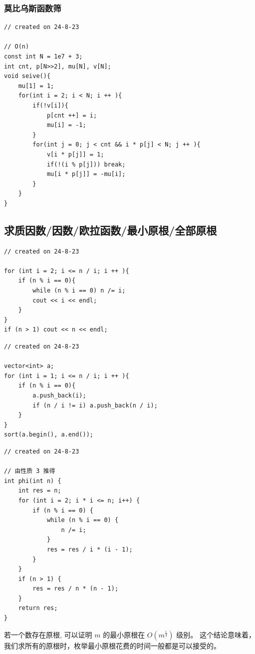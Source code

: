 \documentclass[a4paper,12pt]{article}
\begin{document}
\subsubsection{莫比乌斯函数筛}

\begin{lstlisting}
// created on 24-8-23

// O(n)
const int N = 1e7 + 3;
int cnt, p[N>>2], mu[N], v[N];
void seive(){
    mu[1] = 1;
    for(int i = 2; i < N; i ++ ){
        if(!v[i]){
            p[cnt ++] = i;
            mu[i] = -1;
        }
        for(int j = 0; j < cnt && i * p[j] < N; j ++ ){
            v[i * p[j]] = 1;
            if(!(i % p[j])) break;
            mu[i * p[j]] = -mu[i];
        }
    }
}
\end{lstlisting}

\subsection{求质因数/因数/欧拉函数/最小原根/全部原根}

\begin{lstlisting}
// created on 24-8-23

for (int i = 2; i <= n / i; i ++ ){
    if (n % i == 0){
        while (n % i == 0) n /= i;
        cout << i << endl;
    }
}
if (n > 1) cout << n << endl;
\end{lstlisting}

\begin{lstlisting}
// created on 24-8-23

vector<int> a;
for (int i = 1; i <= n / i; i ++ ){
    if (n % i == 0){
        a.push_back(i);
        if (n / i != i) a.push_back(n / i);
    }
}
sort(a.begin(), a.end());
\end{lstlisting}

\begin{lstlisting}
// created on 24-8-23

// 由性质 3 推得
int phi(int n) {
    int res = n;
    for (int i = 2; i * i <= n; i++) {
        if (n % i == 0) {
            while (n % i == 0) {
                n /= i;
            }
            res = res / i * (i - 1);
        }
    }
    if (n > 1) {
        res = res / n * (n - 1);
    }
    return res;
}
\end{lstlisting}

\noindent 若一个数存在原根, 可以证明 \(m\) 的最小原根在 \(O(m^{\frac{1}{4}})\) 级别。
这个结论意味着，我们求所有的原根时，枚举最小原根花费的时间一般都是可以接受的。\\
\end{document}
